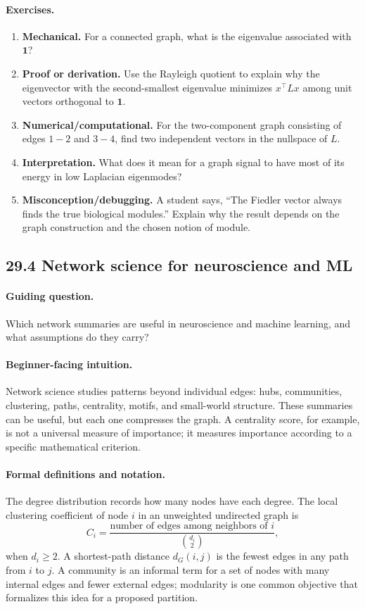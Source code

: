 \paragraph{Exercises.}
\begin{enumerate}[label=\textbf{29.3.\arabic*.}, leftmargin=*]
\item \textbf{Mechanical.} For a connected graph, what is the eigenvalue associated with \(\mathbf 1\)?
\item \textbf{Proof or derivation.} Use the Rayleigh quotient to explain why the eigenvector with the second-smallest eigenvalue minimizes \(x^\top Lx\) among unit vectors orthogonal to \(\mathbf 1\).
\item \textbf{Numerical/computational.} For the two-component graph consisting of edges \(1-2\) and \(3-4\), find two independent vectors in the nullspace of \(L\).
\item \textbf{Interpretation.} What does it mean for a graph signal to have most of its energy in low Laplacian eigenmodes?
\item \textbf{Misconception/debugging.} A student says, ``The Fiedler vector always finds the true biological modules.'' Explain why the result depends on the graph construction and the chosen notion of module.
\end{enumerate}

\subsection{29.4 Network science for neuroscience and ML}

\paragraph{Guiding question.}
Which network summaries are useful in neuroscience and machine learning, and what assumptions do they carry?

\paragraph{Beginner-facing intuition.}
Network science studies patterns beyond individual edges: hubs, communities, clustering, paths, centrality, motifs, and small-world structure. These summaries can be useful, but each one compresses the graph. A centrality score, for example, is not a universal measure of importance; it measures importance according to a specific mathematical criterion.

\paragraph{Formal definitions and notation.}
The degree distribution records how many nodes have each degree. The local clustering coefficient of node \(i\) in an unweighted undirected graph is
\[
C_i=\frac{\text{number of edges among neighbors of }i}
{\binom{d_i}{2}},
\]
when \(d_i\geq2\). A shortest-path distance \(d_G(i,j)\) is the fewest edges in any path from \(i\) to \(j\). A community is an informal term for a set of nodes with many internal edges and fewer external edges; modularity is one common objective that formalizes this idea for a proposed partition.


